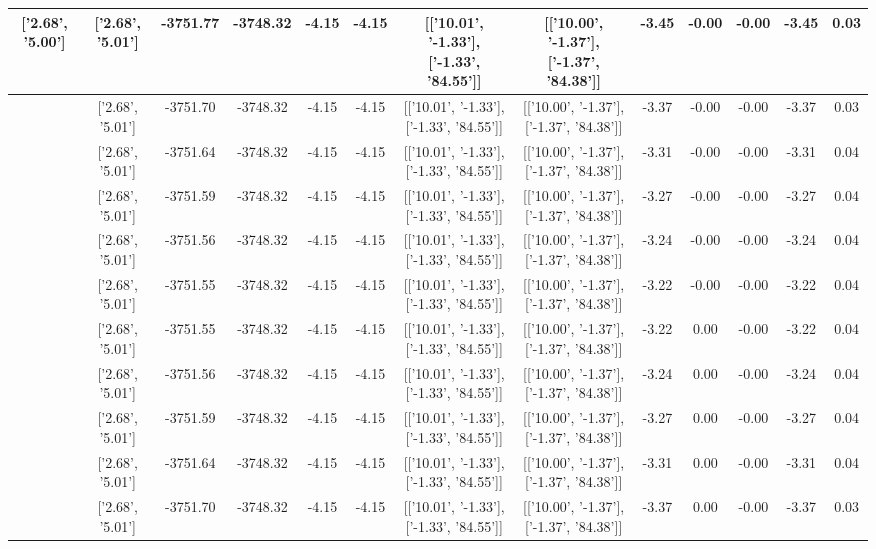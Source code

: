 \begin{table}[htbp]
\begin{adjustbox}{angle=90}
\begin{tabular}{|c|c|c|c|c|c|c|c|c|c|c|c|c|}
 ['2.68', '5.00'] & ['2.68', '5.01'] & -3751.77 & -3748.32 & -4.15 & -4.15 & [['10.01', '-1.33'], ['-1.33', '84.55']] & [['10.00', '-1.37'], ['-1.37', '84.38']] & -3.45 & -0.00 & -0.00 & -3.45 & 0.03\\ \hline
 ['2.68', '5.00'] & ['2.68', '5.01'] & -3751.70 & -3748.32 & -4.15 & -4.15 & [['10.01', '-1.33'], ['-1.33', '84.55']] & [['10.00', '-1.37'], ['-1.37', '84.38']] & -3.37 & -0.00 & -0.00 & -3.37 & 0.03\\ \hline
 ['2.68', '5.00'] & ['2.68', '5.01'] & -3751.64 & -3748.32 & -4.15 & -4.15 & [['10.01', '-1.33'], ['-1.33', '84.55']] & [['10.00', '-1.37'], ['-1.37', '84.38']] & -3.31 & -0.00 & -0.00 & -3.31 & 0.04\\ \hline
 ['2.68', '5.00'] & ['2.68', '5.01'] & -3751.59 & -3748.32 & -4.15 & -4.15 & [['10.01', '-1.33'], ['-1.33', '84.55']] & [['10.00', '-1.37'], ['-1.37', '84.38']] & -3.27 & -0.00 & -0.00 & -3.27 & 0.04\\ \hline
 ['2.68', '5.01'] & ['2.68', '5.01'] & -3751.56 & -3748.32 & -4.15 & -4.15 & [['10.01', '-1.33'], ['-1.33', '84.55']] & [['10.00', '-1.37'], ['-1.37', '84.38']] & -3.24 & -0.00 & -0.00 & -3.24 & 0.04\\ \hline
 ['2.68', '5.01'] & ['2.68', '5.01'] & -3751.55 & -3748.32 & -4.15 & -4.15 & [['10.01', '-1.33'], ['-1.33', '84.55']] & [['10.00', '-1.37'], ['-1.37', '84.38']] & -3.22 & -0.00 & -0.00 & -3.22 & 0.04\\ \hline
 ['2.68', '5.01'] & ['2.68', '5.01'] & -3751.55 & -3748.32 & -4.15 & -4.15 & [['10.01', '-1.33'], ['-1.33', '84.55']] & [['10.00', '-1.37'], ['-1.37', '84.38']] & -3.22 & 0.00 & -0.00 & -3.22 & 0.04\\ \hline
 ['2.69', '5.01'] & ['2.68', '5.01'] & -3751.56 & -3748.32 & -4.15 & -4.15 & [['10.01', '-1.33'], ['-1.33', '84.55']] & [['10.00', '-1.37'], ['-1.37', '84.38']] & -3.24 & 0.00 & -0.00 & -3.24 & 0.04\\ \hline
 ['2.69', '5.01'] & ['2.68', '5.01'] & -3751.59 & -3748.32 & -4.15 & -4.15 & [['10.01', '-1.33'], ['-1.33', '84.55']] & [['10.00', '-1.37'], ['-1.37', '84.38']] & -3.27 & 0.00 & -0.00 & -3.27 & 0.04\\ \hline
 ['2.69', '5.01'] & ['2.68', '5.01'] & -3751.64 & -3748.32 & -4.15 & -4.15 & [['10.01', '-1.33'], ['-1.33', '84.55']] & [['10.00', '-1.37'], ['-1.37', '84.38']] & -3.31 & 0.00 & -0.00 & -3.31 & 0.04\\ \hline
 ['2.69', '5.01'] & ['2.68', '5.01'] & -3751.70 & -3748.32 & -4.15 & -4.15 & [['10.01', '-1.33'], ['-1.33', '84.55']] & [['10.00', '-1.37'], ['-1.37', '84.38']] & -3.37 & 0.00 & -0.00 & -3.37 & 0.03\\ \hline

\end{tabular}
\end{adjustbox}
\end{table}
